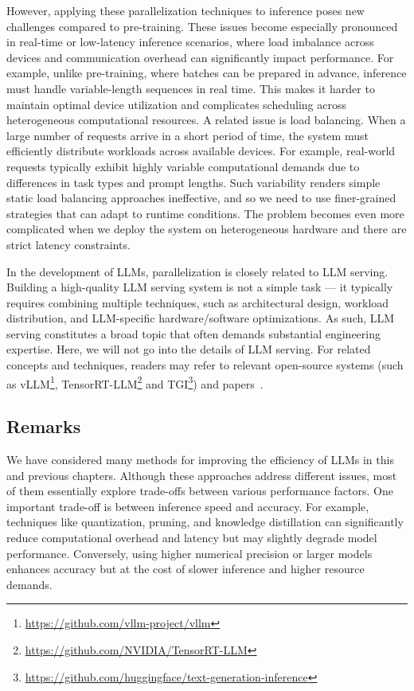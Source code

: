 However, applying these parallelization techniques to inference poses new challenges compared to pre-training. These issues become especially pronounced in real-time or low-latency inference scenarios, where load imbalance across devices and communication overhead can significantly impact performance. For example, unlike pre-training, where batches can be prepared in advance, inference must handle variable-length sequences in real time. This makes it harder to maintain optimal device utilization and complicates scheduling across heterogeneous computational resources. A related issue is load balancing. When a large number of requests arrive in a short period of time, the system must efficiently distribute workloads across available devices. For example, real-world requests typically exhibit highly variable computational demands due to differences in task types and prompt lengths. Such variability renders simple static load balancing approaches ineffective, and so we need to use finer-grained strategies that can adapt to runtime conditions. The problem becomes even more complicated when we deploy the system on heterogeneous hardware and there are strict latency constraints.

In the development of LLMs, parallelization is closely related to LLM serving. Building a high-quality LLM serving system is not a simple task --- it typically requires combining multiple techniques, such as architectural design, workload distribution, and LLM-specific hardware/software optimizations. As such, LLM serving constitutes a broad topic that often demands substantial engineering expertise. Here, we will not go into the details of LLM serving. For related concepts and techniques, readers may refer to relevant open-source systems (such as vLLM\footnote{\url{https://github.com/vllm-project/vllm}}, TensorRT-LLM\footnote{\url{https://github.com/NVIDIA/TensorRT-LLM}} and TGI\footnote{\url{https://github.com/huggingface/text-generation-inference}}) and papers~\cite{pope-etal:2023efficiently,li-etal:2024llm}.

\subsection{Remarks}

We have considered many methods for improving the efficiency of LLMs in this and previous chapters. Although these approaches address different issues, most of them essentially explore trade-offs between various performance factors. One important trade-off is between inference speed and accuracy. For example, techniques like quantization, pruning, and knowledge distillation can significantly reduce computational overhead and latency but may slightly degrade model performance. Conversely, using higher numerical precision or larger models enhances accuracy but at the cost of slower inference and higher resource demands.


